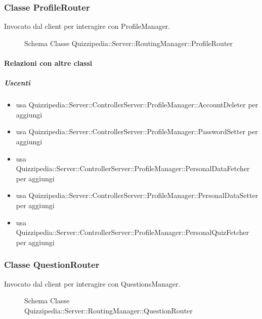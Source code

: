 \subsubsection{Classe ProfileRouter}
Invocato dal client per interagire con ProfileManager.
\begin{figure}[H]
\centering
\noindent{}
\caption[Schema Classe ProfileRouter]{Schema Classe Quizzipedia::Server::RoutingManager::ProfileRouter}
\end{figure}
\paragraph{Relazioni con altre classi}
\subparagraph{Uscenti}
\begin{itemize}
\item usa Quizzipedia::Server::ControllerServer::ProfileManager::AccountDeleter per aggiungi
\item usa Quizzipedia::Server::ControllerServer::ProfileManager::PasswordSetter per aggiungi
\item usa Quizzipedia::Server::ControllerServer::ProfileManager::PersonalDataFetcher per aggiungi
\item usa Quizzipedia::Server::ControllerServer::ProfileManager::PersonalDataSetter per aggiungi
\item usa Quizzipedia::Server::ControllerServer::ProfileManager::PersonalQuizFetcher per aggiungi
\end{itemize}
\subsubsection{Classe QuestionRouter}
Invocato dal client per interagire con QuestionsManager.
\begin{figure}[H]
\centering
\noindent{}
\caption[Schema Classe QuestionRouter]{Schema Classe Quizzipedia::Server::RoutingManager::QuestionRouter}
\end{figure}
